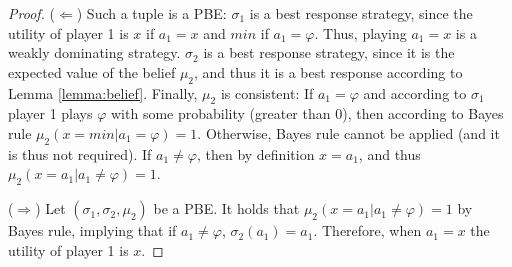 \documentclass[letterpaper]{article} %
\begin{document}
\begin{proof}
($\Leftarrow$) Such a tuple is a PBE: $\sigma_1$ is a best response strategy, since the utility of player 1 is $x$ if $a_1=x$ and $min$ if $a_1=\varphi$. Thus, playing $a_1=x$ is a weakly dominating strategy.
$\sigma_2$ is a best response strategy, since it is the expected value of the belief $\mu_2$, and thus it is a best response  according to Lemma \ref{lemma:belief}.
Finally, $\mu_2$ is consistent:
If $a_1=\varphi$ and according to $\sigma_1$ player 1 plays $\varphi$ with some probability (greater than 0), then according to Bayes rule $\mu_2 (x=min| a_1=\varphi)=1$. Otherwise, Bayes rule cannot be applied (and it is thus not required).
If $a_1\neq \varphi$, then by definition $x=a_1$, and thus $\mu_2(x=a_1| a_1\neq \varphi)=1$.

($\Rightarrow$)
Let $(\sigma_1, \sigma_2, \mu_2)$ be a PBE.
It holds  that $\mu_2(x=a_1| a_1\neq \varphi) = 1$ by Bayes rule, implying that if $a_1\neq\varphi$, $\sigma_2(a_1)=a_1$. Therefore, when $a_1=x$ the utility of player 1 is $x$. %


\end{proof}
\end{document}
